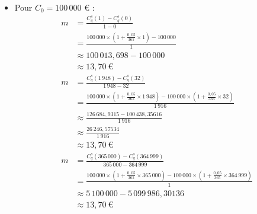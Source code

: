 \documentclass{article}
\begin{document}
\begin{enumerate}[label=\textbf{R1.\arabic*}]
\begin{itemize}
              \item Pour \( C_0 = 100\,000 \) € :
                    \[
                        \begin{aligned}
                            m & = \frac{C^s_q(1) - C^s_q(0)}{1 - 0}                                                                                                                   \\
                              & = \frac{100\,000 \times \left(1 + \frac{0{,}05}{365} \times 1\right) - 100\,000}{1}                                                                   \\
                              & \approx 100\,013{,}698 - 100\,000                                                                                                                     \\
                              & \approx 13{,}70\ \text{€}                                                                                                                           \\[1em]
                            m & = \frac{C^s_q(1\,948) - C^s_q(32)}{1\,948 - 32}                                                                                                       \\
                              & = \frac{100\,000 \times \left(1 + \frac{0{,}05}{365} \times 1\,948\right) - 100\,000 \times \left(1 + \frac{0{,}05}{365} \times 32\right)}{1\,916}    \\
                              & \approx \frac{126\,684{,}9315 - 100\,438{,}35616}{1\,916}                                                                                             \\
                              & \approx \frac{26\,246{,}57534}{1\,916}                                                                                                                \\
                              & \approx 13{,}70\ \text{€}                                                                                                                           \\[1em]
                            m & = \frac{C^s_q(365\,000) - C^s_q(364\,999)}{365\,000 - 364\,999}                                                                                       \\
                              & = \frac{100\,000 \times \left(1 + \frac{0{,}05}{365} \times 365\,000\right) - 100\,000 \times \left(1 + \frac{0{,}05}{365} \times 364\,999\right)}{1} \\
                              & \approx 5\,100\,000 - 5\,099\,986,30136                                                                                                               \\
                              & \approx 13{,}70\ \text{€}                                                                                                                           
                        \end{aligned}
                    \]
                        

\end{itemize}
\end{enumerate}
\end{document}
